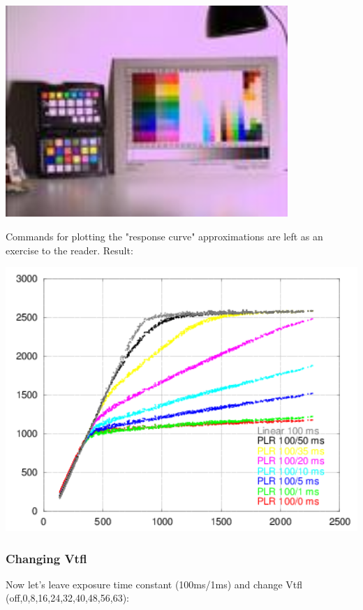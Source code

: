 \begin{center}
\includegraphics[height=8cm]{images/100ms-50ms-32-tiny}
\end{center}

Commands for plotting the "response curve" approximations are left as an exercise to the reader. Result: 

\begin{center}
\includegraphics[height=10cm]{images/100-x-32-plr-vs-30ms-lin}
\end{center}

\subsubsection{Changing Vtfl}

Now let's leave exposure time constant (100ms/1ms) and change Vtfl (off,0,8,16,24,32,40,48,56,63): 

